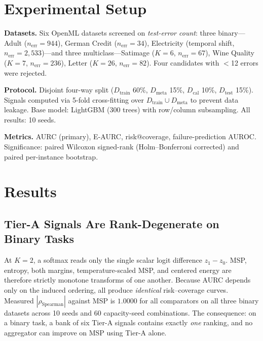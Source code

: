 \documentclass[conference]{IEEEtran}
\begin{document}
\section{Experimental Setup}
\label{sec:setup}

\textbf{Datasets.} Six OpenML datasets screened on \emph{test-error count}: three binary---Adult ($n_{\mathrm{err}}{=}944$), German Credit ($n_{\mathrm{err}}{=}34$), Electricity (temporal shift, $n_{\mathrm{err}}{=}2{,}533$)---and three multiclass---Satimage ($K{=}6$, $n_{\mathrm{err}}{=}67$), Wine Quality ($K{=}7$, $n_{\mathrm{err}}{=}236$), Letter ($K{=}26$, $n_{\mathrm{err}}{=}82$). Four candidates with $<$12 errors were rejected.

\textbf{Protocol.} Disjoint four-way split ($D_{\mathrm{train}}$ 60\%, $D_{\mathrm{meta}}$ 15\%, $D_{\mathrm{cal}}$ 10\%, $D_{\mathrm{test}}$ 15\%). Signals computed via 5-fold cross-fitting over $D_{\mathrm{train}} \cup D_{\mathrm{meta}}$ to prevent data leakage. Base model: LightGBM (300 trees) with row/column subsampling. All results: 10 seeds.

\textbf{Metrics.} AURC (primary), E-AURC, risk@coverage, failure-prediction AUROC. Significance: paired Wilcoxon signed-rank (Holm--Bonferroni corrected) and paired per-instance bootstrap.

\section{Results}
\label{sec:results}

\subsection{Tier-A Signals Are Rank-Degenerate on Binary Tasks}
\label{sec:degeneracy}

At $K{=}2$, a softmax reads only the single scalar logit difference $z_1 - z_0$. MSP, entropy, both margins, temperature-scaled MSP, and centered energy are therefore strictly monotone transforms of one another. Because AURC depends only on the induced ordering, all produce \emph{identical} risk--coverage curves. Measured $|\rho_{\mathrm{Spearman}}|$ against MSP is $1.0000$ for all comparators on all three binary datasets across 10 seeds and 60 capacity-seed combinations. The consequence: on a binary task, a bank of six Tier-A signals contains exactly \emph{one} ranking, and no aggregator can improve on MSP using Tier-A alone.
\end{document}
